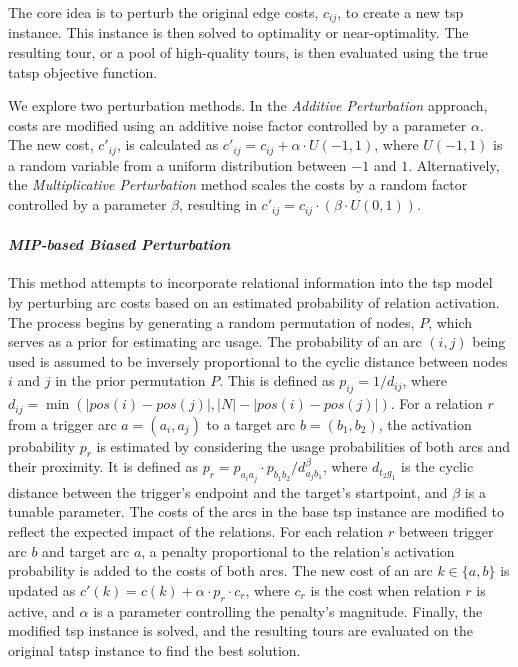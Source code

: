 \documentclass[twocolumn, switch]{article} %
\begin{document}
The core idea is to perturb the original edge costs, $c_{ij}$, to create a new \gls{tsp} instance.
This instance is then solved to optimality or near-optimality. The resulting tour, or a pool of high-quality tours, is then evaluated using the true \gls{tatsp} objective function.

We explore two perturbation methods. In the \textit{Additive Perturbation} approach, costs are modified using an additive noise factor controlled by a parameter $\alpha$. The new cost, $c'_{ij}$, is calculated as $c'_{ij} = c_{ij} + \alpha \cdot U(-1, 1)$, where $U(-1, 1)$ is a random variable from a uniform distribution between $-1$ and $1$. Alternatively, the \textit{Multiplicative Perturbation} method scales the costs by a random factor controlled by a parameter $\beta$, resulting in $c'_{ij} = c_{ij} \cdot (\beta \cdot U(0, 1))$.

\paragraph{\textit{MIP-based Biased Perturbation}}
This method attempts to incorporate relational information into the \gls{tsp} model by perturbing arc costs based on an estimated probability of relation activation. The process begins by generating a random permutation of nodes, $P$, which serves as a prior for estimating arc usage. The probability of an arc $(i, j)$ being used is assumed to be inversely proportional to the cyclic distance between nodes $i$ and $j$ in the prior permutation $P$. This is defined as $p_{ij} = 1/d_{ij}$, where $d_{ij} = \min(|pos(i)-pos(j)|, |N| - |pos(i)-pos(j)|)$. For a relation $r$ from a trigger arc $a=(a_i, a_j)$ to a target arc $b=(b_1, b_2)$, the activation probability $p_r$ is estimated by considering the usage probabilities of both arcs and their proximity. It is defined as $p_r = p_{a_ia_j} \cdot p_{b_1b_2} / d_{a_jb_1}^\beta$, where $d_{t_2g_1}$ is the cyclic distance between the trigger's endpoint and the target's startpoint, and $\beta$ is a tunable parameter. The costs of the arcs in the base \gls{tsp} instance are modified to reflect the expected impact of the relations. For each relation $r$ between trigger arc $b$ and target arc $a$, a penalty proportional to the relation's activation probability is added to the costs of both arcs. The new cost of an arc $k \in \{a,b\}$ is updated as $c'(k) = c(k) + \alpha \cdot p_r \cdot c_r$, where $c_r$ is the cost when relation $r$ is active, and $\alpha$ is a parameter controlling the penalty's magnitude. Finally, the modified \gls{tsp} instance is solved, and the resulting tours are evaluated on the original \gls{tatsp} instance to find the best solution.
\end{document}
